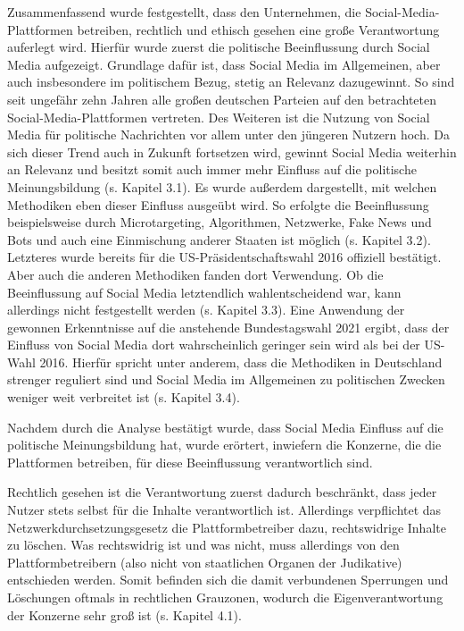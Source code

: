 Zusammenfassend wurde festgestellt, dass den Unternehmen, die Social-Media-Plattformen betreiben, rechtlich und ethisch gesehen eine große Verantwortung auferlegt wird.
Hierfür wurde zuerst die politische Beeinflussung durch Social Media aufgezeigt. Grundlage dafür ist, dass Social Media im Allgemeinen, aber auch insbesondere im politischem Bezug, stetig an Relevanz dazugewinnt. So sind seit ungefähr zehn Jahren alle großen deutschen Parteien auf den betrachteten Social-Media-Plattformen vertreten. Des Weiteren ist die Nutzung von Social Media für politische Nachrichten vor allem unter den jüngeren Nutzern hoch. Da sich dieser Trend auch in Zukunft fortsetzen wird, gewinnt Social Media weiterhin an Relevanz und besitzt somit auch immer mehr Einfluss auf die politische Meinungsbildung (s. Kapitel 3.1). 
Es wurde außerdem dargestellt, mit welchen Methodiken eben dieser Einfluss ausgeübt wird. So erfolgte die Beeinflussung beispielsweise durch Microtargeting, Algorithmen, Netzwerke, Fake News und Bots und auch eine Einmischung anderer Staaten ist möglich (s. Kapitel 3.2). Letzteres wurde bereits für die US-Präsidentschaftswahl 2016 offiziell bestätigt. Aber auch die anderen Methodiken fanden dort Verwendung. Ob die Beeinflussung auf Social Media letztendlich wahlentscheidend war, kann allerdings nicht festgestellt werden (s. Kapitel 3.3).
Eine Anwendung der gewonnen Erkenntnisse auf die anstehende Bundestagswahl 2021 ergibt, dass der Einfluss von Social Media dort wahrscheinlich geringer sein wird als bei der US-Wahl 2016. Hierfür spricht unter anderem, dass die Methodiken in Deutschland strenger reguliert sind und Social Media im Allgemeinen zu politischen Zwecken weniger weit verbreitet ist (s. Kapitel 3.4).

Nachdem durch die Analyse bestätigt wurde, dass Social Media Einfluss auf die politische Meinungsbildung hat, wurde erörtert, inwiefern die Konzerne, die die Plattformen betreiben, für diese Beeinflussung verantwortlich sind.

Rechtlich gesehen ist die Verantwortung zuerst dadurch beschränkt, dass jeder Nutzer stets selbst für die Inhalte verantwortlich ist. Allerdings verpflichtet das Netzwerkdurchsetzungsgesetz die Plattformbetreiber dazu, rechtswidrige Inhalte zu löschen. Was rechtswidrig ist und was nicht, muss allerdings von den Plattformbetreibern (also nicht von staatlichen Organen der Judikative) entschieden werden. Somit befinden sich die damit verbundenen Sperrungen und Löschungen oftmals in rechtlichen Grauzonen, wodurch die Eigenverantwortung der Konzerne sehr groß ist (s. Kapitel 4.1).

